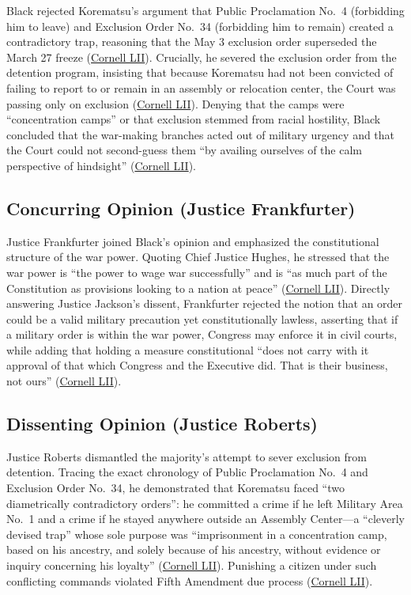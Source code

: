 \documentclass[12pt]{article}
\begin{document}
Black rejected Korematsu's argument that Public Proclamation No.\ 4 (forbidding him to leave) and Exclusion Order No.\ 34 (forbidding him to remain) created a contradictory trap, reasoning that the May 3 exclusion order superseded the March 27 freeze (\href{https://www.law.cornell.edu/supremecourt/text/323/214}{Cornell LII}). Crucially, he severed the exclusion order from the detention program, insisting that because Korematsu had not been convicted of failing to report to or remain in an assembly or relocation center, the Court was passing only on exclusion (\href{https://www.law.cornell.edu/supremecourt/text/323/214}{Cornell LII}). Denying that the camps were ``concentration camps'' or that exclusion stemmed from racial hostility, Black concluded that the war-making branches acted out of military urgency and that the Court could not second-guess them ``by availing ourselves of the calm perspective of hindsight'' (\href{https://www.law.cornell.edu/supremecourt/text/323/214}{Cornell LII}).

\subsection{Concurring Opinion (Justice Frankfurter)}
Justice Frankfurter joined Black's opinion and emphasized the constitutional structure of the war power. Quoting Chief Justice Hughes, he stressed that the war power is ``the power to wage war successfully'' and is ``as much part of the Constitution as provisions looking to a nation at peace'' (\href{https://www.law.cornell.edu/supremecourt/text/323/214}{Cornell LII}). Directly answering Justice Jackson's dissent, Frankfurter rejected the notion that an order could be a valid military precaution yet constitutionally lawless, asserting that if a military order is within the war power, Congress may enforce it in civil courts, while adding that holding a measure constitutional ``does not carry with it approval of that which Congress and the Executive did. That is their business, not ours'' (\href{https://www.law.cornell.edu/supremecourt/text/323/214}{Cornell LII}).

\subsection{Dissenting Opinion (Justice Roberts)}
Justice Roberts dismantled the majority's attempt to sever exclusion from detention. Tracing the exact chronology of Public Proclamation No.\ 4 and Exclusion Order No.\ 34, he demonstrated that Korematsu faced ``two diametrically contradictory orders'': he committed a crime if he left Military Area No.\ 1 and a crime if he stayed anywhere outside an Assembly Center---a ``cleverly devised trap'' whose sole purpose was ``imprisonment in a concentration camp, based on his ancestry, and solely because of his ancestry, without evidence or inquiry concerning his loyalty'' (\href{https://www.law.cornell.edu/supremecourt/text/323/214}{Cornell LII}). Punishing a citizen under such conflicting commands violated Fifth Amendment due process (\href{https://www.law.cornell.edu/supremecourt/text/323/214}{Cornell LII}).
\end{document}

